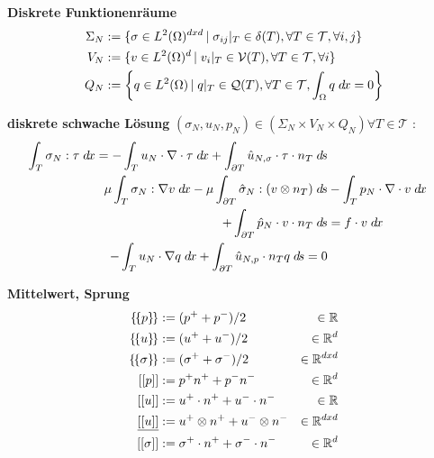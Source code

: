 \begin {definition}\textbf{Diskrete Funktionenräume}\label{def:disk_funk_r�ume}
    \begin{align}
        \Sigma_N &:= \{\sigma \in L^2(\Omega)^{dxd} \,\lvert\; \sigma_{ij} |_T \in \delta(T), \forall T \in \mathcal{T} ,\forall i,j\} \\
        V_N &:= \{v \in L^2(\Omega)^{d} \,\lvert\; v_{i} |_T \in \mathcal{V}(T), \forall T \in \mathcal{T} ,\forall i\} \\
        Q_N &:= \left\{ q \in L^2(\Omega) \,\lvert\; q |_T \in \mathcal{Q}(T), \forall T \in \mathcal{T} ,\int_\Omega q \;d\hspace{-1.25pt} x = 0\right\} 
    \end{align}    
\end {definition}

\begin{definition}\textbf{diskrete schwache Lösung}\label{def:disk_schw_lsg}
    $(\sigma_N,u_N,p_N) \in (\Sigma_N \times V_N \times Q_N ) \forall T \in \mathcal{T}$ :
    \begin{align}
        \int_T \sigma_N : \tau \;d\hspace{-1.25pt} x = -\int_T u_N \cdot \nabla \cdot \tau \;d\hspace{-1.25pt} x 
            + \int_{\partial T} \hat{u}_{N,\sigma} \cdot \tau \cdot n_T \;d\hspace{-1.25pt} s \\
        \mu \int_T \sigma_N : \nabla v \;d\hspace{-1.25pt} x - \mu \int_{\partial T} \hat{\sigma}_N : (v \otimes n_T ) \;d\hspace{-1.25pt} s 
            &- \int_T p_N\cdot \nabla \cdot v \;d\hspace{-1.25pt} x \notag \\
            + \int_{\partial T} \hat{p}_N \cdot v \cdot n_T \;d\hspace{-1.25pt} s &= f \cdot v \;d\hspace{-1.25pt} x \\
        -\int_T u_N \cdot \nabla q \;d\hspace{-1.25pt} x + \int_{\partial T} \hat{u}_{N,p} \cdot n_T q \;d\hspace{-1.25pt} s = 0
    \end{align}

\end{definition}


\begin{definition}\textbf{Mittelwert, Sprung}\label{def:mw_sprung}
    \begin{align}
        \ldc p \rdc &:= ( p^+ + p^- ) / 2 &\in\R \\
        \ldc u\rdc &:= ( u^+ + u^- ) / 2 &\in\Rd \\
        \ldc \sigma\rdc &:= ( \sigma^+ + \sigma^- ) / 2 &\in\Rdd \\
        \lds p\rds &:= p^+ n^+ + p^- n^- &\in\Rd \\
        \lds u\rds &:= u^+ \cdot n^+ + u^- \cdot n^- &\in\R \\
        \ulusp &:= u^+ \otimes n^+ + u^- \otimes n^- &\in\Rdd \\
        \lds \sigma\rds &:= \sigma^+ \cdot n^+ + \sigma^- \cdot n^- &\in\Rd \\
    \end{align}

\end{definition}

